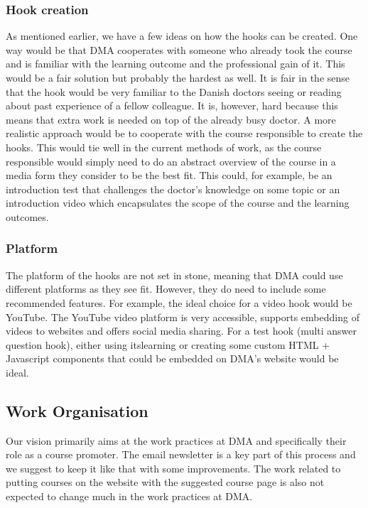 \subsubsection{Hook creation}
As mentioned earlier, we have a few ideas on how the hooks can be created. One way would be that DMA cooperates with someone who already took the course and is familiar with the learning outcome and the professional gain of it. This would be a fair solution but probably the hardest as well. It is fair in the sense that the hook would be very familiar to the Danish doctors seeing or reading about past experience of a fellow colleague. It is, however, hard because this means that extra work is needed on top of the already busy doctor. A more realistic approach would be to cooperate with the course responsible to create the hooks. This would tie well in the current methods of work, as the course responsible would simply need to do an abstract overview of the course in a media form they consider to be the best fit. This could, for example, be an introduction test that challenges the doctor’s knowledge on some topic or an introduction video which encapsulates the scope of the course and the learning outcomes. 

\subsubsection{Platform}
The platform of the hooks are not set in stone, meaning that DMA could use different platforms as they see fit. However, they do need to include some recommended features. For example, the ideal choice for a video hook would be YouTube. The YouTube video platform is very accessible, supports embedding of videos to websites and offers social media sharing. For a test hook (multi answer question hook), either using itslearning or creating some custom HTML + Javascript components that could be embedded on DMA’s website would be ideal. 

\subsection{Work Organisation} 
Our vision primarily aims at the work practices at DMA and specifically their role as a course promoter. The email newsletter is a key part of this process and we suggest to keep it like that with some improvements. The work related to putting courses on the website with the suggested course page is also not expected to change much in the work practices at DMA.

